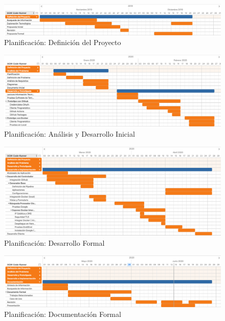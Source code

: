 \documentclass[a4paper,11pt]{book}
\begin{document}
\begin{figure}[H]
\centering
\includegraphics[scale=0.20]{imagenes/gant1.png}
\caption{ Planificación: Definición del Proyecto}
\end{figure}

\begin{figure}[H]
\centering
\includegraphics[scale=0.20]{imagenes/gant2.png}
\caption{ Planificación: Análisis y Desarrollo Inicial }
\end{figure}

\begin{figure}[H]
\centering
\includegraphics[scale=0.20]{imagenes/gant3.png}
\caption{ Planificación: Desarrollo Formal}
\end{figure}

\begin{figure}[H]
\centering
\includegraphics[scale=0.20]{imagenes/gant4.png}
\caption{ Planificación: Documentación Formal}
\end{figure}
\end{document}
